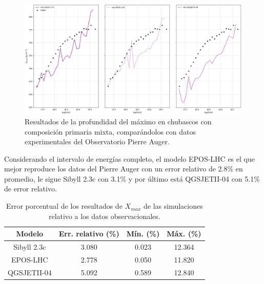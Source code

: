 \begin{figure}[] 
\centering
\includegraphics[width=\textwidth]{Figuras/Xmax_mix}
\caption{Resultados de la profundidad del máximo en chubascos con composición primaria mixta, comparándolos con datos experimentales del Observatorio Pierre Auger.}
\label{fig:xmax_mix}
\end{figure}

Considerando el intervalo de energías completo, el modelo EPOS-LHC es el que mejor reproduce los datos del Pierre Auger con un error relativo de 2.8\% en promedio, le sigue Sibyll 2.3c con 3.1\% y por último está QGSJETII-04 con 5.1\% de error relativo.\\

\begin{table}[h]
\centering
\caption{Error porcentual de los resultados de $X_{max}$ de las simulaciones relativo a los datos observacionales.}
\begin{tabular}{c|ccc}

Modelo & Err. relativo (\%) & Mín. (\%) & Máx. (\%) \\ \hline
Sibyll 2.3c 	& 3.080              & 0.023     & 12.364    \\ \hline
EPOS-LHC   		& 2.778              & 0.050     & 11.820    \\ \hline
QGSJETII-04 	& 5.092              & 0.589     & 12.840    \\ \hline
\end{tabular}
\end{table}

